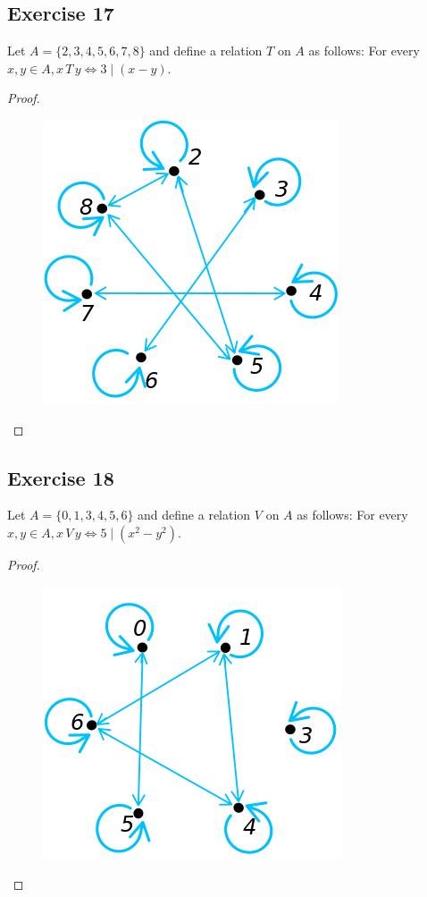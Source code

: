 \documentclass[14pt]{extarticle}
\begin{document}
\subsection{Exercise 17}
Let \(A = \{2, 3, 4, 5, 6, 7, 8\}\) and define a relation $T$ on $A$ as follows: For every \(x, y \in A, x \, T \, y
\iff 3 \mid (x - y)\).

\begin{proof}
        \begin{figure}[ht!]
                \centering
                \includegraphics[scale=0.4]{../images/8.1.17.png}
        \end{figure}
\end{proof}

\subsection{Exercise 18}
Let \(A = \{0, 1, 3, 4, 5, 6\}\) and define a relation $V$ on $A$ as follows: For every \(x, y \in A, x \, V \, y \iff
5 \mid (x^2 - y^2)\).

\begin{proof}
        \begin{figure}[ht!]
                \centering
                \includegraphics[scale=0.4]{../images/8.1.18.png}
        \end{figure}
\end{proof}
\end{document}
